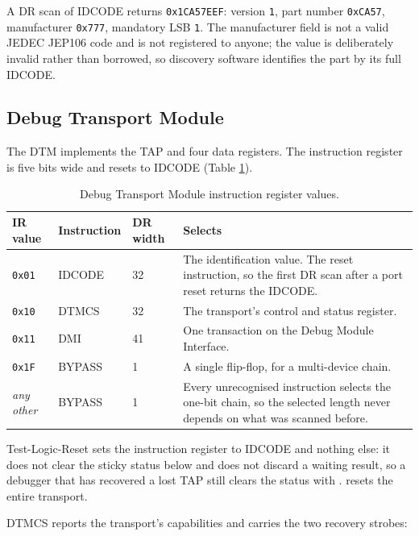 A DR scan of IDCODE returns \texttt{0x1CA57EEF}: version \texttt{1}, part number \texttt{0xCA57}, manufacturer \texttt{0x777}, mandatory LSB \texttt{1}. The manufacturer field is not a valid JEDEC JEP106 code and is not registered to anyone; the value is deliberately invalid rather than borrowed, so discovery software identifies the part by its full IDCODE.

\subsection{Debug Transport Module} \label{ss:debug-dtm}

The DTM implements the TAP and four data registers. The instruction register is five bits wide and resets to IDCODE (Table \ref{t:debug-ir}).

\begin{table}[htb]
	\centering
	\caption{Debug Transport Module instruction register values.}
	\label{t:debug-ir}
	\begin{tabular}{ l l l p{6.4cm} }
	\textbf{IR value} & \textbf{Instruction} & \textbf{DR width} & \textbf{Selects} \\ \hline
	\texttt{0x01} & IDCODE & 32 & The identification value. The reset instruction, so the first DR scan after a port reset returns the IDCODE. \\
	\rowcolor{tablehighlightcolor} \texttt{0x10} & DTMCS & 32 & The transport's control and status register. \\
	\texttt{0x11} & DMI & 41 & One transaction on the Debug Module Interface. \\
	\rowcolor{tablehighlightcolor} \texttt{0x1F} & BYPASS & 1 & A single flip-flop, for a multi-device chain. \\
	\textit{any other} & BYPASS & 1 & Every unrecognised instruction selects the one-bit chain, so the selected length never depends on what was scanned before. \\
	\hline
	\end{tabular}
\end{table}

Test-Logic-Reset sets the instruction register to IDCODE and nothing else: it does not clear the sticky status below and does not discard a waiting result, so a debugger that has recovered a lost TAP still clears the status with .  resets the entire transport.

DTMCS reports the transport's capabilities and carries the two recovery strobes:

